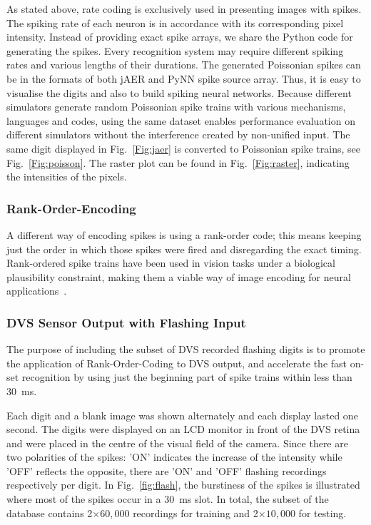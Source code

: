 \documentclass[journal]{journal}
\begin{document}
	As stated above, rate coding is exclusively used in presenting images with spikes.
	The spiking rate of each neuron is in accordance with its corresponding pixel intensity.
	Instead of providing exact spike arrays, we share the Python code for generating the spikes.
	Every recognition system may require different spiking rates and various lengths of their durations.
	The generated Poissonian spikes can be in the formats of both jAER and PyNN spike source array.
	Thus, it is easy to visualise the digits and also to build spiking neural networks.
	Because different simulators generate random Poissonian spike trains with various mechanisms, languages and codes, using the same dataset enables performance evaluation on different simulators without the interference created by non-unified input.
	The same digit displayed in Fig.~\ref{Fig:jaer} is converted to Poissonian spike trains, see Fig.~\ref{Fig:poisson}.
	The raster plot can be found in Fig.~\ref{Fig:raster}, indicating the intensities of the pixels.
	
	
	
	\subsubsection{Rank-Order-Encoding}
	A different way of encoding spikes is using a rank-order code; this means
	keeping just the order in which those spikes were fired and disregarding the exact timing. Rank-ordered spike trains have been used in vision tasks under a biological plausibility constraint, making them a viable way of image encoding for neural applications~\cite{van2001rate,sen2009evaluating,masmoudi2010novel}.
	
	\subsubsection{DVS Sensor Output with Flashing Input}
	\label{subsec_flash}
	The purpose of including the subset of DVS recorded flashing digits is to promote the application of Rank-Order-Coding to DVS output, and accelerate the fast on-set recognition by using just the beginning part of spike trains within less than 30~ms.
	
	Each digit and a blank image was shown alternately and each display lasted one second.
	The digits were displayed on an LCD monitor in front of the DVS retina~\cite{serrano2013128} and were placed in the centre of the visual field of the camera.
	Since there are two polarities of the spikes: 'ON' indicates the increase of the intensity while 'OFF' reflects the opposite, there are 'ON' and 'OFF' flashing recordings respectively per digit.
	In Fig.~\ref{fig:flash}, the burstiness of the spikes is illustrated where most of the spikes occur in a 30~ms slot. 
	In total, the subset of the database contains 2$\times$$60,000$ recordings for training and 2$\times$$10,000$ for testing.
	
\end{document}
